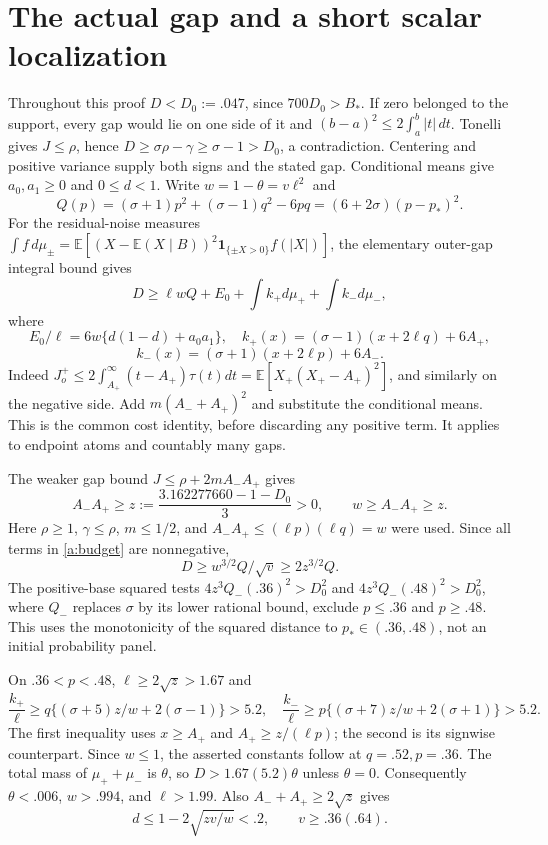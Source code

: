 \documentclass[11pt]{article}
\newcommand{\E}{\mathbb E}\newcommand{\Pp}{\mathbb P}
\begin{document}
\section{The actual gap and a short scalar localization}
Throughout this proof $D< D_0:=.047$, since $700D_0>B_*$.
If zero belonged to the support, every gap would lie on one side of it and
$(b-a)^2\le2\int_a^b|t|\,dt$. Tonelli gives $J\le\rho$, hence
$D\ge\sigma\rho-\gamma\ge\sigma-1>D_0$, a contradiction.
Centering and positive variance supply both signs and the stated gap.
Conditional means give $a_0,a_1\ge0$ and $0\le d<1$.
Write $w=1-\theta=v\ell^2$ and
\[
 Q(p)=(\sigma+1)p^2+(\sigma-1)q^2-6pq
      =(6+2\sigma)(p-p_*)^2.
\]
For the residual-noise measures
$\int f\,d\mu_\pm=\E[(X-\E(X\mid B))^2\mathbf1_{\{\pm X>0\}}f(|X|)]$,
the elementary outer-gap integral bound gives
\begin{equation}\label{a:budget}
 D\ge\ell wQ+E_0+\int k_+d\mu_++\int k_-d\mu_-,
\end{equation}
where
\[
 E_0/\ell=6w\{d(1-d)+a_0a_1\},\quad
 k_+(x)=(\sigma-1)(x+2\ell q)+6A_+,
\]
\[
 k_-(x)=(\sigma+1)(x+2\ell p)+6A_-.
\]
Indeed $J_o^+\le2\int_{A_+}^{\infty}(t-A_+)\tau(t)dt
=\E[X_+(X_+-A_+)^2]$, and similarly on the negative side. Add
$m(A_-+A_+)^2$ and substitute the conditional means. This is the common
cost identity, before discarding any positive term. It applies to endpoint
atoms and countably many gaps.

The weaker gap bound $J\le\rho+2mA_-A_+$ gives
\[
 A_-A_+\ge z:=\frac{3.162277660-1-D_0}{3}>0,\qquad w\ge A_-A_+\ge z.
\]
Here $\rho\ge1$, $\gamma\le\rho$, $m\le1/2$, and
$A_-A_+\le(\ell p)(\ell q)=w$ were used. Since all terms in
\eqref{a:budget} are nonnegative,
\[
             D\ge w^{3/2}Q/\sqrt v\ge2z^{3/2}Q.
\]
The positive-base squared tests $4z^3Q_-(.36)^2>D_0^2$ and
$4z^3Q_-(.48)^2>D_0^2$, where $Q_-$ replaces $\sigma$ by its lower
rational bound, exclude $p\le.36$ and $p\ge.48$. This uses the monotonicity
of the squared distance to $p_*\in(.36,.48)$, not an initial probability
panel.

On $.36<p<.48$, $\ell\ge2\sqrt z>1.67$ and
\[
 \frac{k_+}{\ell}\ge q\{(\sigma+5)z/w+2(\sigma-1)\}>5.2,
 \quad
 \frac{k_-}{\ell}\ge p\{(\sigma+7)z/w+2(\sigma+1)\}>5.2.
\]
The first inequality uses $x\ge A_+$ and
$A_+\ge z/(\ell p)$; the second is its signwise counterpart.
Since $w\le1$, the asserted constants follow at $q=.52,p=.36$.
The total mass of $\mu_++\mu_-$ is $\theta$, so
$D>1.67(5.2)\theta$ unless $\theta=0$. Consequently
$\theta<.006$, $w>.994$, and $\ell>1.99$.
Also $A_-+A_+\ge2\sqrt z$ gives
\[
 d\le1-2\sqrt{zv/w}<.2,
 \qquad v\ge .36(.64).
\]
\end{document}
